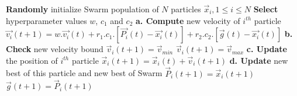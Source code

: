 \begin{algorithmic}
\State \textbf{Randomly} initialize Swarm population of $N$ particles $\vec{x}_i , 1 \le i \le N$
\State \textbf{Select} hyperparameter values $w$, $c_1$ and $c_2$
        \State \textbf{a. Compute} new velocity of $i^{th}$ particle
            \State $\vec{v_i}(t+1) = w.\vec{v_i}(t)+
                    r_1.c_1.[\vec{P_i}(t)-\vec{x_i}(t)]+
                    r_2.c_2.[\vec{g}(t)-\vec{x_i}(t)]$
        \State \textbf{b. Check} new velocity bound 
                \State $\vec{v}_i(t+1) = \vec{v}_{min}$
                \State $\vec{v}_i(t+1) = \vec{v}_{max}$
            \EndIf
        \State \textbf{c. Update} the position of $i^{th}$ particle
        \State $\vec{x}_i(t+1)=\vec{x}_i(t) + \vec{v}_i(t+1)$
        \State \textbf{d. Update} new best of this particle and new best of Swarm
            \State $\vec{P}_i(t+1) = \vec{x}_i(t+1)$
        \EndIf
            \State $\vec{g}(t+1) = \vec{P}_i(t+1)$
        \EndIf
    \EndFor
\EndFor

\end{algorithmic}